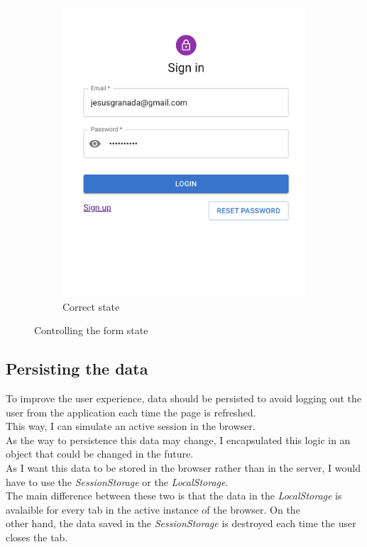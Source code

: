 \begin{figure}[H]
\begin{subfigure}[T]{0.49\textwidth}
            \includegraphics[width=\textwidth]{assets/form_correct.png}
            \caption{Correct state}
            \label{fig:impl_form_correct}
        \end{subfigure}
           \caption{Controlling the form state}
           \label{fig:impl_form}
    \end{figure}

    \subsection{Persisting the data}
    To improve the user experience, data should be persisted to avoid logging out the user from the application each time the page is refreshed. \\
    This way, I can simulate an active session in the browser. \\
    As the way to persistence this data may change, I encapsulated this logic in an object that could be changed in the future. \\

    As I want this data to be stored in the browser rather than in the server, I would have to use the \textit{SessionStorage} or the \textit{LocalStorage}. \\
    The main difference between these two is that the data in the \textit{LocalStorage} is avalaible for every tab in the active instance of the browser. On the \\
    other hand, the data saved in the \textit{SessionStorage} is destroyed each time the user closes the tab. \\

